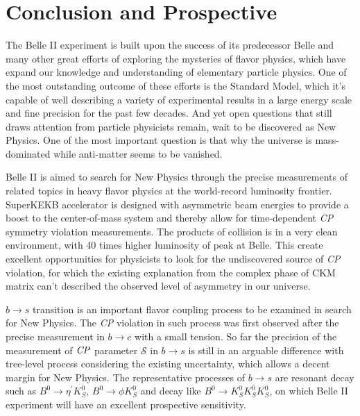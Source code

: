 \chapter{Conclusion and Prospective}

The Belle II experiment is built upon the success of its predecessor Belle and many other great efforts of exploring the mysteries of flavor physics, which have expand our knowledge and understanding of elementary particle physics. One of the most outstanding outcome of these efforts is the Standard Model, which it's capable of well describing a variety of experimental results in a large energy scale and fine precision for the past few decades. And yet open questions that still draws attention from particle physicists remain, wait to be discovered as New Physics. One of the most important question is that why the universe is mass-dominated while anti-matter seems to be vanished. 

Belle II is aimed to search for New Physics through the precise measurements of related topics in heavy flavor physics at the world-record luminosity frontier. SuperKEKB accelerator is designed with asymmetric beam
energies to provide a boost to the center-of-mass system and thereby allow for time-dependent
\textit{CP} symmetry violation measurements. The products of collision is in a very clean environment, with 40 times higher luminosity of peak at Belle. This create excellent opportunities for physicists to look for the undiscovered source of \textit{CP} violation, for which the existing explanation from the complex phase of CKM matrix can't described the observed level of asymmetry in our universe.

 $b\to s$ transition is an important flavor coupling process to be examined in search for New Physics. The \textit{CP} violation in such process was first observed after the precise measurement in $b\to c$ with a small tension. So far the precision of the measurement of $\it{CP}$ parameter $\mathcal{S}$ in $b\to s$ is still in an arguable difference with tree-level process considering the existing uncertainty, which allows a decent margin for New Physics. The representative processes of $b\to s$ are resonant decay such as $B^0 \to \eta^{'} K_S^0$, $B^0 \to \phi K_S^0$ and decay like $B^0 \to K_S^0  K_S^0  K_S^0$, on which Belle II experiment will have an excellent prospective sensitivity.


